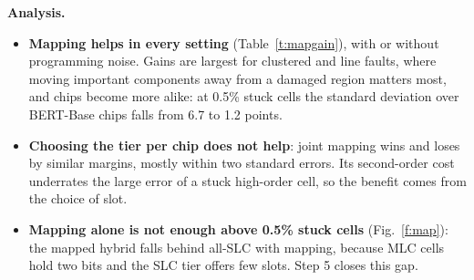 \documentclass[10pt,a4paper]{article}
\begin{document}
\begin{table}[H]
\centering\small
\caption{Paired gain of fault-aware mapping over no mitigation (hybrid, magnitude, 20\% SLC), and of joint
tier-and-slot mapping over fault-aware mapping, in accuracy points (mean $\pm$ s.e. over 10 chips).}\label{t:mapgain}
\setlength{\tabcolsep}{3.5pt}
\end{table}

\noindent\textbf{Analysis.}
\begin{itemize}
\item \textbf{Mapping helps in every setting} (Table~\ref{t:mapgain}), with or without programming noise.
Gains are largest for clustered and line faults, where moving important components away from a damaged
region matters most, and chips become more alike: at 0.5\% stuck cells the standard deviation over
BERT-Base chips falls from 6.7 to 1.2 points.
\item \textbf{Choosing the tier per chip does not help}: joint mapping wins and loses by similar margins,
mostly within two standard errors. Its second-order cost underrates the large error of a stuck high-order
cell, so the benefit comes from the choice of slot.
\item \textbf{Mapping alone is not enough above 0.5\% stuck cells} (Fig.~\ref{f:map}): the mapped hybrid falls
behind all-SLC with mapping, because MLC cells hold two bits and the SLC tier offers few slots. Step 5
closes this gap.
\end{itemize}
\end{document}
